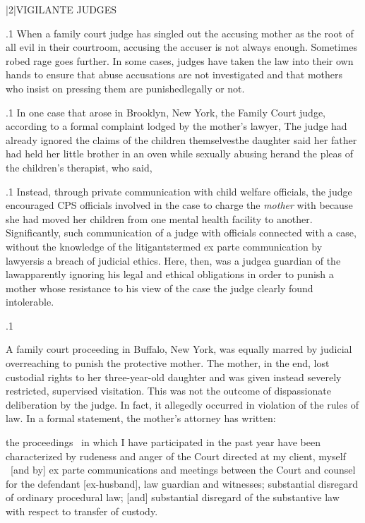 \documentclass[11pt, twoside]{article}
\begin{document}
{\s|2|{VIGILANTE JUDGES}

\p.1{%
\noindent{}When a family court judge has singled out the accusing mother as the
root of all evil in their courtroom, accusing the accuser is not always
enough. Sometimes robed rage goes further. In some cases, judges have
taken the law into their own hands to ensure that abuse accusations
are not investigated and that mothers who insist on pressing them are
punished\mdash{}legally or not.
}%

\p.1{%
In one case that arose in Brooklyn, New York, the Family Court judge,
according to a formal complaint lodged by the mother’s lawyer,  The judge had already ignored the claims of
the children themselves\mdash{}the daughter said her father had held her little brother in an oven while sexually abusing her\mdash{}and the pleas of the
children’s therapist, who said, 
}%

\p.1{%
Instead, through private communication with child welfare officials,
the judge encouraged CPS officials involved in the case to charge
the \textit{mother} with  because she had moved her children from
one mental health facility to another. Significantly, such communication of a judge with officials connected with a case, without the knowledge of the litigants\mdash{}termed ex parte communication by lawyers\mdash{}is a
breach of judicial ethics. Here, then, was a judge\mdash{}a guardian of the
law\mdash{}apparently ignoring his legal and ethical obligations in order to
punish a mother whose resistance to his view of the case the judge clearly
found intolerable.
}%

\p.1{%
A family court proceeding in Buffalo, New York, was equally marred
by judicial overreaching to punish the protective mother. The mother,
in the end, lost custodial rights to her three-year-old daughter and was
given instead severely restricted, supervised visitation. This was not the
outcome of dispassionate deliberation by the judge. In fact, it allegedly
occurred in violation of the rules of law. In a formal statement, the
mother’s attorney has written:

\begin{blockQuote}
the proceedings \ellThree{2pt}{2pt}\ in which I have participated in the past year
have been characterized by rudeness and anger of the Court directed at my client, myself \ellThree{2pt}{2pt}\ [and by] ex parte communications
and meetings between the Court and counsel for the defendant
[ex-husband], law guardian and witnesses; substantial disregard
of ordinary procedural law; [and] substantial disregard of the
substantive law with respect to transfer of custody.
\end{blockQuote}

}}
\end{document}
